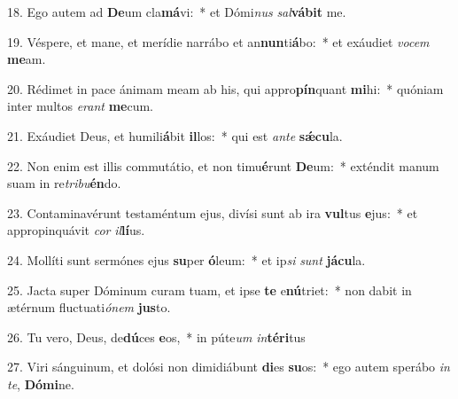 18. Ego autem ad \textbf{De}um cla\textbf{má}vi:~*  et Dómi\textit{nus} \textit{sal}\textbf{vá}\textbf{bit} me.\

19. Véspere, et mane, et merídie narrábo et an\textbf{nun}ti\textbf{á}bo:~*  et exáudiet \textit{vo}\textit{cem} \textbf{me}am.\

20. Rédimet in pace ánimam meam ab his, qui appro\textbf{pín}quant \textbf{mi}hi:~*  quóniam inter multos \textit{e}\textit{rant} \textbf{me}cum.\

21. Exáudiet Deus, et humili\textbf{á}bit \textbf{il}los:~*  qui est \textit{an}\textit{te} \textbf{sǽ}\textbf{cu}la.\

22. Non enim est illis commutátio, et non timu\textbf{é}runt \textbf{De}um:~*  exténdit manum suam in re\textit{tri}\textit{bu}\textbf{én}do.\

23. Contaminavérunt testaméntum ejus, divísi sunt ab ira \textbf{vul}tus \textbf{e}jus:~*  et appropinquávit \textit{cor} \textit{il}\textbf{lí}us.\

24. Mollíti sunt sermónes ejus \textbf{su}per \textbf{ó}leum:~*  et ip\textit{si} \textit{sunt} \textbf{já}\textbf{cu}la.\

25. Jacta super Dóminum curam tuam, et ipse \textbf{te} e\textbf{nú}triet:~*  non dabit in ætérnum fluctuati\textit{ó}\textit{nem} \textbf{jus}to.\

26. Tu vero, Deus, de\textbf{dú}ces \textbf{e}os,~*  in púte\textit{um} \textit{in}\textbf{tér}\textbf{i}tus\

27. Viri sánguinum, et dolósi non dimidiábunt \textbf{di}es \textbf{su}os:~*  ego autem sperábo \textit{in} \textit{te}, \textbf{Dó}\textbf{mi}ne.\

